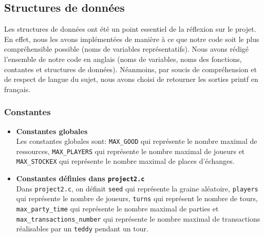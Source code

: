 \documentclass[12pt]{article}
\begin{document}
        \subsection{Structures de données}
        Les structures de données ont été un point essentiel de la réflexion sur le projet. En effet, nous les avons implémentées de manière à ce que notre code soit le plus compréhensible possible (noms de variables représentatifs). Nous avons rédigé l'ensemble de notre code en anglais (noms de variables, noms des fonctions, contantes et structures de données). Néanmoins, par soucis de compréhension et de respect de langue du sujet, nous avons choisi de retourner les sorties printf en français.\\
        \subsubsection{Constantes}
        \begin{itemize}
         \item \textbf{Constantes globales}\\
         Les constantes globales sont: \texttt{MAX\_GOOD} qui représente le nombre maximal de ressources, \texttt{MAX\_PLAYERS} qui représente le nombre maximal de joueurs et \texttt{MAX\_STOCKEX} qui représente le nombre maximal de places d'échanges.
         \item \textbf{Constantes définies dans \texttt{project\-2.c}}\\
         Dans \texttt{project\-2.c}, on définit \texttt{seed} qui représente la graine aléatoire, \texttt{players} qui représente le nombre de joueurs, \texttt{turns} qui représent le nombre de tours, \texttt{max\_party\_time} qui représente le nombre maximal de parties et \texttt{max\_transactions\_number} qui représente le nombre maximal de transactions réalisables par un \texttt{teddy} pendant un tour.
        \end{itemize}
\end{document}
